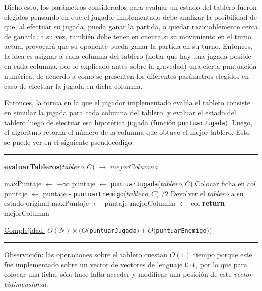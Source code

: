 \documentclass[12pt,a4paper]{article}
\makeatletter
\newenvironment{breakablealgorithm}
  {%
   \begin{flushleft}
     \refstepcounter{algorithm}%
     \hrule height.8pt depth0pt \kern2pt%
     \renewcommand{\caption}[2][\relax]{%
       {\raggedright\textbf{\ALG@name~\thealgorithm} ##2\par}%
       \ifx\relax##1\relax %
         \addcontentsline{loa}{algorithm}{\protect\numberline{\thealgorithm}##2}%
       \else %
         \addcontentsline{loa}{algorithm}{\protect\numberline{\thealgorithm}##1}%
       \fi
       \kern2pt\hrule\kern2pt
     }
  }{%
     \kern2pt\hrule\relax%
   \end{flushleft}
  }
\makeatother
\begin{document}
    Dicho esto, los parámetros considerados para evaluar un estado del tablero fueron elegidos pensando en que el jugador implementado debe analizar la posibilidad de que, al efectuar su jugada, pueda ganar la partida, o quedar razonablemente cerca de ganarla; a su vez, también debe tener en cuenta si su movimiento en el turno actual provocará que su oponente pueda ganar la partida en su turno. Entonces, la idea es asignar a cada columna del tablero (notar que hay una jugada posible en cada columna, por lo explicado antes sobre la gravedad) una cierta puntuación numérica, de acuerdo a como se presenten los diferentes parámetros elegidos en caso de efectuar la jugada en dicha columna.
    
    Entonces, la forma en la que el jugador implementado evalúa el tablero consiste en simular la jugada para cada columna del tablero, y evaluar el estado del tablero luego de efectuar esa hipotética jugada (función \texttt{puntuarJugada}). Luego, el algoritmo retorna el número de la columna que obtuvo el mejor tablero. Esto se puede ver en el siguiente pseudocódigo:
    
    \begin{breakablealgorithm}{\textbf{evaluarTableros}($tablero, C$) $\to$ $mejorColumna$}
    \begin{algorithmic}[1]
		\State maxPuntaje $\gets$ $- \infty$     
		        
		    \State puntaje $\gets$ \texttt{puntuarJugada}($tablero, C$)     
		    \State Colocar ficha en $col$       
		    \State puntaje $\gets$ puntaje - \texttt{puntuarEnemigo}($tablero, C$) $/ 2$     
		    \State Devolver el $tablero$ a su estado original       
		         
		        \State maxPuntaje $\gets$ puntaje        
		        \State mejorColumna $\gets$ col         
		    \EndIf
        \EndFor
        \State \textbf{return} mejorColumna
        
        \medskip
		\Statex \underline{Complejidad:} $O(N) \times (O($\texttt{puntuarJugada}$) + O($\texttt{puntuarEnemigo}$))$
    \end{algorithmic}
    \end{breakablealgorithm}
    
    \underline{Observación}: las operaciones sobre el tablero cuestan $O(1)$ tiempo porque este fue implementado sobre un vector de vectores de lenguaje \texttt{C++}, por lo que para colocar una ficha, sólo hace falta acceder y modificar una posición de este \textit{vector bidimensional}. \\[2pt]
    
\end{document}
